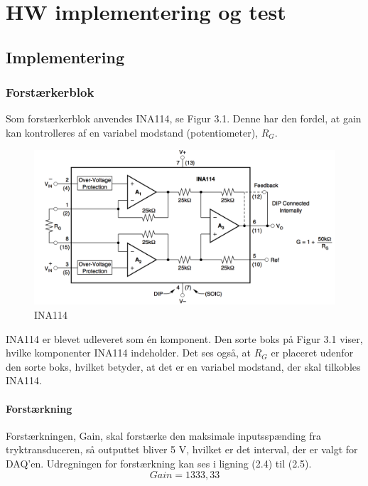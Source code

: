 \chapter{HW implementering og test}

\section{Implementering}

\subsection{Forstærkerblok}
Som forstærkerblok anvendes INA114, se Figur 3.1. Denne har den fordel, at gain kan kontrolleres af en variabel modstand (potentiometer), $R_{G}$. 

\begin{figure}[H]
	\centering
	\includegraphics[width=1\textwidth]{Figurer/Snip20151117_104}
	\caption{INA114}
\end{figure}

INA114 er blevet udleveret som én komponent. Den sorte boks på Figur 3.1 viser, hvilke komponenter INA114 indeholder. Det ses også, at $R_{G}$ er placeret udenfor den sorte boks, hvilket betyder, at det er en variabel modstand, der skal tilkobles INA114.     

\subsubsection{Forstærkning}
Forstærkningen, Gain, skal forstærke den maksimale inputsspænding fra tryktransduceren, så outputtet bliver 5 V, hvilket er det interval, der er valgt for DAQ'en. Udregningen for forstærkning kan ses i ligning (2.4) til (2.5).
\begin{equation}
	Gain = 1333,33
\end{equation}


